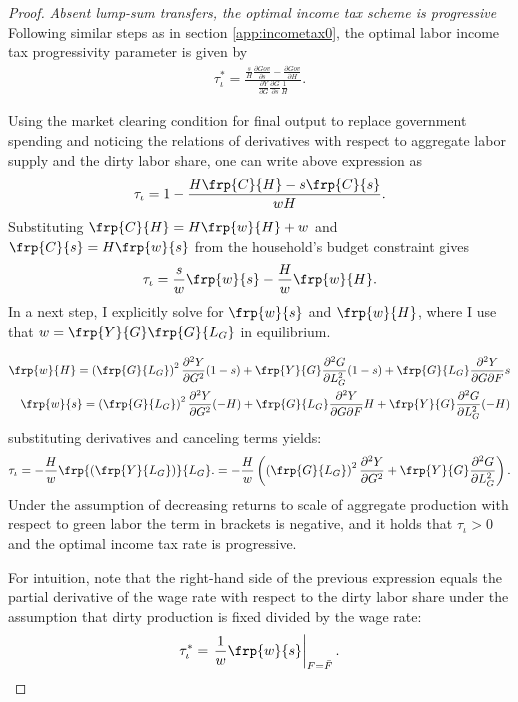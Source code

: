 \begin{proof}\textit{Absent lump-sum transfers, the optimal income tax scheme is progressive}
Following similar steps as in section \ref{app:incometax0}, the optimal labor income tax progressivity parameter is given by
\begin{align}
\tau_{\iota}^*=\frac{\frac{s}{H}\frac{\partial Gov}{\partial s}- \frac{\partial Gov}{\partial H}}{\frac{\partial Y}{\partial G}\frac{\partial G}{\partial s}\frac{1}{H}}.
\end{align}

	Using the market clearing condition for final output to replace government spending and noticing the relations of derivatives with respect to aggregate labor supply and the dirty labor share, one can write above expression as
	\begin{align}
	\tau_{\iota}=1-\frac{H\frp{C}{H}-s\frp{C}{s}}{wH}.
	\end{align}
	Substituting $\frp{C}{H}=H\frp{w}{H}+w$ and $\frp{C}{s}=H\frp{w}{s}$ from the household's budget constraint gives
	\begin{align}
	\tau_{\iota}=\frac{s}{w}\frp{w}{s}-\frac{H}{w}\frp{w}{H}.
	\end{align}
In a next step, I explicitly solve for $\frp{w}{s}$ and $\frp{w}{H}$, where I use that $w=\frp{Y}{G}\frp{G}{L_G}$ in equilibrium.

\begin{align}
\frp{w}{H}=\left(\frp{G}{L_G}\right)^2\frac{\partial^2Y}{\partial G^2}(1-s)+\frp{Y}{G}\frac{\partial ^2G}{\partial L_G^2}(1-s)+\frp{G}{L_G}\frac{\partial^2 Y}{\partial G \partial F}s\\
\frp{w}{s}= \left(\frp{G}{L_G}\right)^2\frac{\partial ^2Y}{\partial G^2}(-H)+\frp{G}{L_G}\frac{\partial ^2Y}{\partial G \partial F}H+\frp{Y}{G}\frac{\partial ^2 G}{\partial L_G^2}(-H)
\end{align}
substituting derivatives and canceling terms yields:
\begin{align}
\tau_\iota= -\frac{H}{w}\frp{\left(\frp{Y}{L_G}\right)}{L_G}.=-\frac{H}{w}\left(\left(\frp{G}{L_G}\right)^2\frac{\partial ^2Y}{\partial G^2}+\frp{Y}{G}\frac{\partial ^2G}{\partial L_G ^2}\right).
\end{align}
Under the assumption of decreasing returns to scale of aggregate production with respect to green labor the term in brackets is negative, and it holds that $\tau_\iota >0$ and the optimal income tax rate is progressive. 

For intuition, note that the right-hand side of the previous expression equals the partial derivative of the wage rate with respect to the dirty labor share under the assumption that dirty production is fixed divided by the wage rate:
\begin{align}
\tau^*_\iota =\left. \frac{1}{w}\frp{w}{s} \right|_{F=\bar{F}}.
\end{align}


\end{proof}
